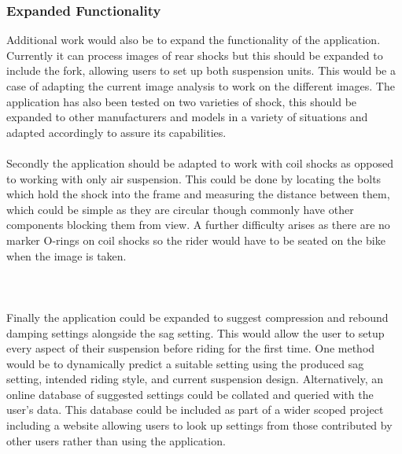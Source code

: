 		\subsubsection{Expanded Functionality}
			Additional work would also be to expand the functionality of the application. Currently it can process images of rear shocks but this should be expanded to include the fork, allowing users to set up both suspension units. This would be a case of adapting the current image analysis to work on the different images. The application has also been tested on two varieties of shock, this should be expanded to other manufacturers and models in a variety of situations and adapted accordingly to assure its capabilities.
			\\\\
			Secondly the application should be adapted to work with coil shocks as opposed to working with only air suspension. This could be done by locating the bolts which hold the shock into the frame and measuring the distance between them, which could be simple as they are circular though commonly have other components blocking them from view. A further difficulty arises as there are no marker O-rings on coil shocks so the rider would have to be seated on the bike when the image is taken.
			\\\\
			\\\\
			Finally the application could be expanded to suggest compression and rebound damping settings alongside the sag setting. This would allow the user to setup every aspect of their suspension before riding for the first time. One method would be to dynamically predict a suitable setting using the produced sag setting, intended riding style, and current suspension design. Alternatively, an online database of suggested settings could be collated and queried with the user's data. This database could be included as part of a wider scoped project including a website allowing users to look up settings from those contributed by other users rather than using the application.
